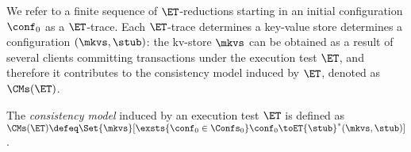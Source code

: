 We refer to a finite sequence of $\ET$-reductions starting in an initial configuration $\conf_{0}$ as a $\ET$-trace. 
Each $\ET$-trace determines a key-value store determines a configuration $(\mkvs, \stub)$: the 
kv-store $\mkvs$ can be obtained as a result of several clients committing transactions under the 
execution test $\ET$, and therefore it contributes to the consistency model induced by $\ET$, 
denoted as $\CMs(\ET)$.
%
%

\begin{definition}
\label{def:cm}
The \emph{consistency model} induced by an execution test $\ET$ is defined as 
\(
\CMs(\ET) \defeq 
\Set{\mkvs}[ 
\exsts{\conf_0 \in \Confs_0}
\conf_0 \toET{\stub}^{*} (\mkvs, \stub)
]
\).
\end{definition}
%

